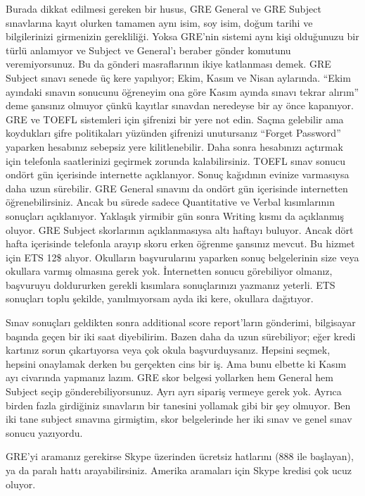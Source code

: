 \documentclass[12pt]{article}
\begin{document}
Burada dikkat edilmesi gereken bir husus, GRE General ve GRE Subject sınavlarına kayıt olurken tamamen aynı isim, soy isim, doğum tarihi ve bilgilerinizi girmenizin gerekliliği. Yoksa GRE’nin sistemi aynı kişi olduğunuzu bir türlü anlamıyor ve Subject ve General’ı beraber gönder komutunu veremiyorsunuz. Bu da gönderi masraflarının ikiye katlanması demek. GRE Subject sınavı senede üç kere yapılıyor; Ekim, Kasım ve Nisan aylarında. ``Ekim ayındaki sınavın sonucunu öğreneyim ona göre Kasım ayında sınavı tekrar alırım'' deme şansınız olmuyor çünkü kayıtlar sınavdan neredeyse bir ay önce kapanıyor. GRE ve TOEFL sistemleri için şifrenizi bir yere not edin. Saçma gelebilir ama koydukları şifre politikaları yüzünden şifrenizi unutursanız “Forget Password” yaparken hesabınız sebepsiz yere kilitlenebilir. Daha sonra hesabınızı açtırmak için telefonla saatlerinizi geçirmek zorunda kalabilirsiniz. TOEFL sınav sonucu ondört gün içerisinde internette açıklanıyor. Sonuç kağıdının evinize varmasıysa daha uzun sürebilir. GRE General sınavını da ondört gün içerisinde internetten öğrenebilirsiniz. Ancak bu sürede sadece Quantitative ve Verbal kısımlarının sonuçları açıklanıyor. Yaklaşık yirmibir gün sonra Writing kısmı da açıklanmış oluyor. GRE Subject skorlarının açıklanmasıysa altı haftayı buluyor. Ancak dört hafta içerisinde telefonla arayıp skoru erken öğrenme şansınız mevcut. Bu hizmet için ETS 12\$ alıyor. Okulların başvurularını yaparken sonuç belgelerinin size veya okullara varmış olmasına gerek yok. İnternetten sonucu görebiliyor olmanız, başvuruyu doldururken gerekli kısımlara sonuçlarınızı yazmanız yeterli. ETS sonuçları toplu şekilde, yanılmıyorsam ayda iki kere, okullara dağıtıyor.

Sınav sonuçları geldikten sonra additional score report’ların gönderimi, bilgisayar başında geçen bir iki saat diyebilirim. Bazen daha da uzun sürebiliyor; eğer kredi kartınız sorun çıkartıyorsa veya çok okula başvurduysanız. Hepsini seçmek, hepsini onaylamak derken bu gerçekten cins bir iş. Ama bunu elbette ki Kasım ayı civarında yapmanız lazım. GRE skor belgesi yollarken hem General hem Subject seçip gönderebiliyorsunuz. Ayrı ayrı sipariş vermeye gerek yok. Ayrıca birden fazla girdiğiniz sınavların bir tanesini yollamak gibi bir şey olmuyor. Ben iki tane subject sınavına girmiştim, skor belgelerinde her iki sınav ve genel sınav sonucu yazıyordu.

GRE’yi aramanız gerekirse Skype üzerinden ücretsiz hatlarını (888 ile başlayan), ya da paralı hattı arayabilirsiniz. Amerika aramaları için Skype kredisi çok ucuz oluyor.
 
\end{document}
